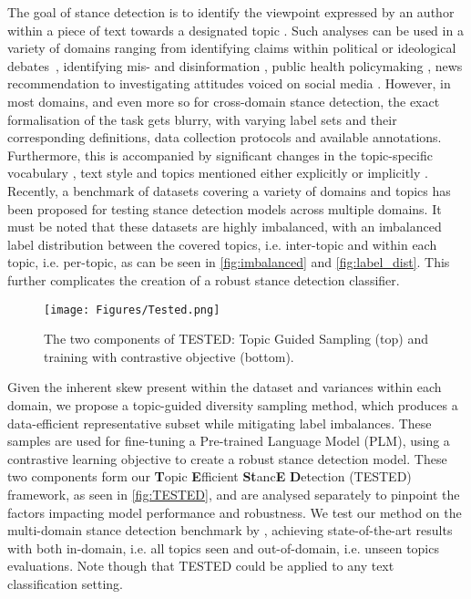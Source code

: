 \documentclass[11pt]{article}
\begin{document}
The goal of stance detection is to identify the viewpoint expressed by an author within a piece of text towards a designated topic \citep{mohammad2016semeval}. Such analyses can be used in a variety of domains ranging from identifying claims within political or ideological debates~\citep{somasundaran2010recognizing, thomas2006get}, identifying mis- and disinformation \citep{hanselowski2018retrospective,hardalov2021survey}, public health policymaking \citep{glandt2021stance,hossain2020covidlies, osnabrugge2023cross}, news recommendation \citep{reuver2021no} to investigating attitudes voiced on social media  \citep{qazvinian2011rumor,augenstein-etal-2016-stance,conforti2020will}. However, in most domains, and even more so for cross-domain stance detection, the exact formalisation of the task gets blurry, with varying label sets and their corresponding definitions, data collection protocols and available annotations. Furthermore, this is accompanied by significant changes in the topic-specific vocabulary \citep{somasundaran2010recognizing,wei2019modeling}, text style \citep{pomerleau2017fake, ferreira2016emergent} and topics mentioned either explicitly \citep{qazvinian2011rumor, walker2012corpus} or implicitly \citep{hasan2013stance,gorrell2019semeval}. Recently, a benchmark of  datasets \citep{hardalov2021cross} covering a variety of domains and topics has been proposed for testing stance detection models across multiple domains. It must be noted that these datasets are highly imbalanced, with an imbalanced label distribution between the covered topics, i.e. inter-topic and within each topic, i.e. per-topic, as can be seen in \autoref{fig:imbalanced} and \autoref{fig:label_dist}. This further complicates the creation of a robust stance detection classifier.

\begin{figure}[t]
\centering
\texttt{[image: Figures/Tested.png]}
\caption{The two components of TESTED: Topic Guided Sampling (top) and training with contrastive objective (bottom).}
\label{fig:TESTED}
\end{figure}







Given the inherent skew present within the dataset and variances within each domain, we propose a topic-guided diversity sampling method, which produces a data-efficient representative subset while mitigating label imbalances. These samples are used for fine-tuning a Pre-trained Language Model (PLM), using a contrastive learning objective to create a robust stance detection model. These two components form our \textbf{T}opic \textbf{E}fficient \textbf{St}anc\textbf{E} \textbf{D}etection	(TESTED) framework, as seen in \autoref{fig:TESTED}, and are analysed separately to pinpoint the factors impacting model performance and robustness. We test our method on the multi-domain stance detection benchmark by \citet{hardalov2021cross}, achieving state-of-the-art results with both in-domain, i.e. all topics seen and out-of-domain, i.e. unseen topics evaluations. Note though that TESTED could be applied to any text classification setting.
\end{document}
